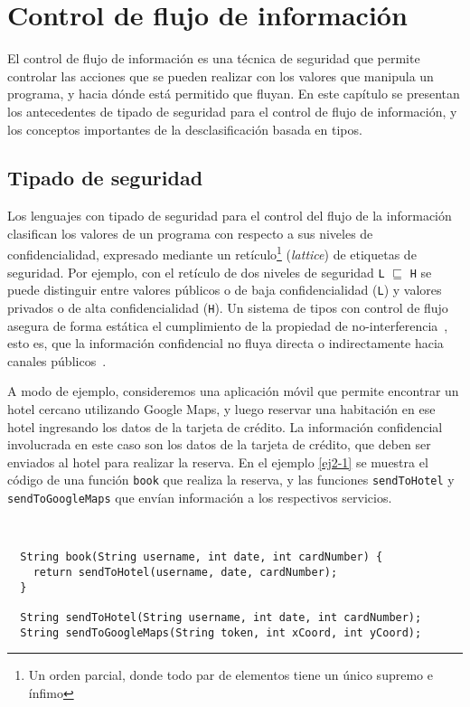 \chapter{Control de flujo de información} \label{controlflujo}
El control de flujo de información es una técnica de seguridad que permite controlar las acciones que se pueden realizar con los valores que manipula un programa, y hacia dónde está permitido que fluyan. En este capítulo se presentan los antecedentes de tipado de seguridad para el control de flujo de información, y los conceptos importantes de la desclasificación basada en tipos.

\section{Tipado de seguridad}
Los lenguajes con tipado de seguridad para el control del flujo de la información clasifican los valores de un programa con respecto a sus niveles de confidencialidad, expresado mediante un retículo\footnote{Un orden parcial, donde todo par de elementos tiene un único supremo e ínfimo} (\emph{lattice}) de etiquetas de seguridad. Por ejemplo, con el retículo de dos niveles de seguridad \texttt{L} $\sqsubseteq$ \texttt{H} se puede distinguir entre valores públicos o de baja confidencialidad (\texttt{L}) y valores privados o de alta confidencialidad (\texttt{H}). Un sistema de tipos con control de flujo asegura de forma estática el cumplimiento de la propiedad de no-interferencia~\cite{noninterference}, esto es, que la información confidencial no fluya directa o indirectamente hacia canales públicos~\cite{volpanoAl:S96}.

A modo de ejemplo, consideremos una aplicación móvil que permite encontrar un hotel cercano utilizando Google Maps, y luego reservar una habitación en ese hotel ingresando los datos de la tarjeta de crédito. La información confidencial involucrada en este caso son los datos de la tarjeta de crédito, que deben ser enviados al hotel para realizar la reserva. En el ejemplo \ref{ej2-1} se muestra el código de una función \texttt{book} que realiza la reserva, y las funciones \texttt{sendToHotel} y \texttt{sendToGoogleMaps} que envían información a los respectivos servicios.
\clearpage
\begin{ej} \ \\
  \normalfont
  \label{ej2-1}
\begin{lstlisting}
  String book(String username, int date, int cardNumber) {
    return sendToHotel(username, date, cardNumber);
  }

  String sendToHotel(String username, int date, int cardNumber);
  String sendToGoogleMaps(String token, int xCoord, int yCoord);
\end{lstlisting}
\end{ej}

